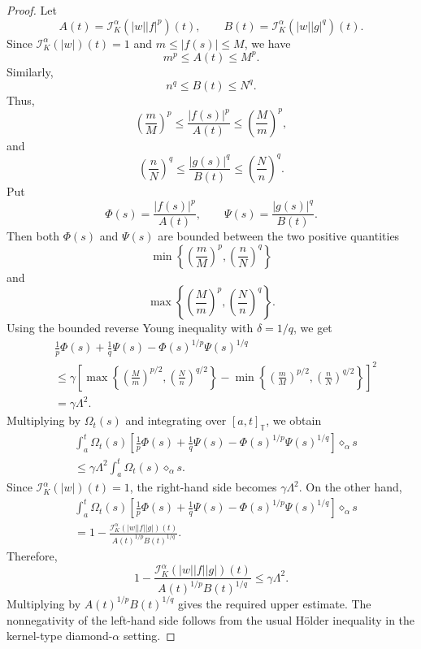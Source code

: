 \documentclass[11pt]{article}
\begin{document}
\begin{proof}
Let
\[
    A(t)=\mathcal{I}_{K}^{\alpha}(|w||f|^p)(t),
    \qquad
    B(t)=\mathcal{I}_{K}^{\alpha}(|w||g|^q)(t).
\]
Since $\mathcal{I}_{K}^{\alpha}(|w|)(t)=1$ and
$m\leq |f(s)|\leq M$, we have
\[
    m^p\leq A(t)\leq M^p.
\]
Similarly,
\[
    n^q\leq B(t)\leq N^q.
\]
Thus,
\[
    \left(\frac{m}{M}\right)^p
    \leq
    \frac{|f(s)|^p}{A(t)}
    \leq
    \left(\frac{M}{m}\right)^p,
\]
and
\[
    \left(\frac{n}{N}\right)^q
    \leq
    \frac{|g(s)|^q}{B(t)}
    \leq
    \left(\frac{N}{n}\right)^q.
\]
Put
\[
    \Phi(s)=\frac{|f(s)|^p}{A(t)},
    \qquad
    \Psi(s)=\frac{|g(s)|^q}{B(t)}.
\]
Then both $\Phi(s)$ and $\Psi(s)$ are bounded between the two positive
quantities
\[
    \min\left\{
    \left(\frac{m}{M}\right)^p,
    \left(\frac{n}{N}\right)^q
    \right\}
\]
and
\[
    \max\left\{
    \left(\frac{M}{m}\right)^p,
    \left(\frac{N}{n}\right)^q
    \right\}.
\]
Using the bounded reverse Young inequality with $\delta=1/q$, we get
\[
\begin{aligned}
&
\frac1p\Phi(s)+\frac1q\Psi(s)
-\Phi(s)^{1/p}\Psi(s)^{1/q}                                      \\
&\leq
\gamma
\left[
\max\left\{
\left(\frac{M}{m}\right)^{p/2},
\left(\frac{N}{n}\right)^{q/2}
\right\}
-
\min\left\{
\left(\frac{m}{M}\right)^{p/2},
\left(\frac{n}{N}\right)^{q/2}
\right\}
\right]^2                                                        \\
&=
\gamma\Lambda^2.
\end{aligned}
\]
Multiplying by $\Omega_t(s)$ and integrating over $[a,t]_{\mathbb{T}}$, we
obtain
\[
\begin{aligned}
&
\int_a^t \Omega_t(s)
\left[
\frac1p\Phi(s)+\frac1q\Psi(s)
-\Phi(s)^{1/p}\Psi(s)^{1/q}
\right]\diamond_{\alpha}s                                      \\
&\leq
\gamma\Lambda^2
\int_a^t \Omega_t(s)\diamond_{\alpha}s.
\end{aligned}
\]
Since $\mathcal{I}_{K}^{\alpha}(|w|)(t)=1$, the right-hand side becomes
$\gamma\Lambda^2$. On the other hand,
\[
\begin{aligned}
&\int_a^t \Omega_t(s)
\left[
\frac1p\Phi(s)+\frac1q\Psi(s)
-\Phi(s)^{1/p}\Psi(s)^{1/q}
\right]\diamond_{\alpha}s                                      \\
&=
1-
\frac{
\mathcal{I}_{K}^{\alpha}(|w||f||g|)(t)
}
{
A(t)^{1/p}B(t)^{1/q}
}.
\end{aligned}
\]
Therefore,
\[
    1-
\frac{
\mathcal{I}_{K}^{\alpha}(|w||f||g|)(t)
}
{
A(t)^{1/p}B(t)^{1/q}
}
\leq
\gamma\Lambda^2.
\]
Multiplying by $A(t)^{1/p}B(t)^{1/q}$ gives the required upper estimate.
The nonnegativity of the left-hand side follows from the usual H\"older
inequality in the kernel-type diamond-$\alpha$ setting.
\end{proof}
\end{document}

